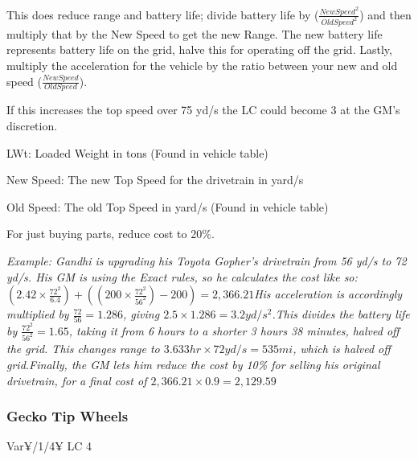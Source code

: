 \begin{multicols*}{2}
	This does reduce range and battery life; divide battery life by ($\frac{New Speed^2}{Old Speed^2}$) and then multiply that by the New Speed to get the new Range. The new battery life represents battery life on the grid, halve this for operating off the grid. Lastly, multiply the acceleration for the vehicle by the ratio between your new and old speed ($\frac{New Speed}{Old Speed}$).
	
	If this increases the top speed over 75 yd/s the LC could become 3 at the GM's discretion.
		
	
	LWt: Loaded Weight in tons (Found in vehicle table)
	
	New Speed: The new Top Speed for the drivetrain in yard/s
	
	Old Speed: The old Top Speed in yard/s (Found in vehicle table)
	
	For just buying parts, reduce cost to 20\%.
	
	\textcolor{OliveGreen}{\textit{Example: Gandhi is upgrading his Toyota Gopher's drivetrain from 56 yd/s to 72 yd/s. His GM is using the Exact rules, so he calculates the cost like so: \newline$(2.42 \times \frac{72^2}{6.4}) + ((200 \times \frac{ 72^2}{56^2}) - 200) = 2,366.21$\newline His acceleration is accordingly multiplied by $\frac{72}{56}=1.286$, giving $2.5\times1.286 = 3.2 yd/s^2$.\newline This divides the battery life by $\frac{72^2}{56^2} = 1.65$, taking it from 6 hours to a shorter 3 hours 38 minutes, halved off the grid. This changes range to $3.633 hr\times72 yd/s = 535 mi$, which is halved off grid.\newline Finally, the GM lets him reduce the cost by 10\% for selling his original drivetrain, for a final cost of $2,366.21\times0.9 = 2,129.59$}}
	
	\subsubsection{Gecko Tip Wheels}
	Var¥/1/4¥ LC 4
	

\end{multicols*}
